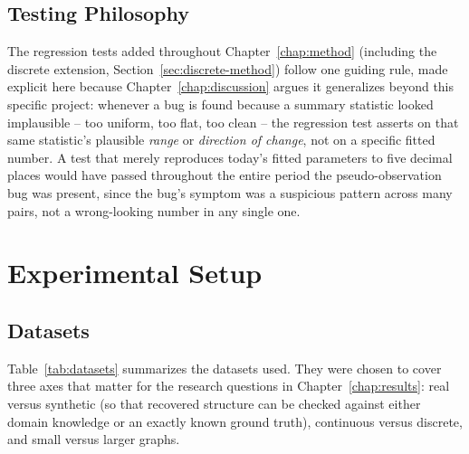 \documentclass[
  english,
  class=report,
  accentcolor=2c,
  marginpar=false,
  parskip=half-,
  fontsize=11pt,
  ruledheaders=false,
  pdfa=false,
  IMRAD=false,
  thesis={type=master}
]{tudapub}
\begin{document}
\section{Testing Philosophy}
The regression tests added throughout Chapter~\ref{chap:method} (including
the discrete extension, Section~\ref{sec:discrete-method}) follow one
guiding rule, made explicit here because Chapter~\ref{chap:discussion}
argues it generalizes beyond this
specific project: whenever a bug is found because a summary statistic
looked implausible -- too uniform, too flat, too clean -- the regression
test asserts on that same statistic's plausible \emph{range} or
\emph{direction of change}, not on a specific fitted number. A test that
merely reproduces today's fitted parameters to five decimal places would
have passed throughout the entire period the pseudo-observation bug was
present, since the bug's symptom was a suspicious pattern across many
pairs, not a wrong-looking number in any single one.

\chapter{Experimental Setup}
\label{chap:setup}

\section{Datasets}
Table~\ref{tab:datasets} summarizes the datasets used. They were chosen to
cover three axes that matter for the research questions in
Chapter~\ref{chap:results}: real versus synthetic (so that recovered
structure can be checked against either domain knowledge or an exactly
known ground truth), continuous versus discrete, and small versus larger
graphs.
\end{document}

